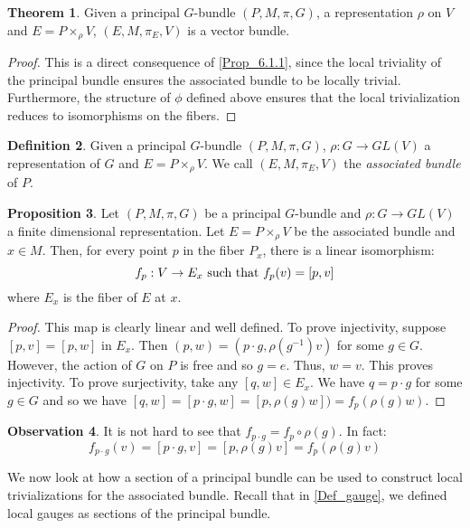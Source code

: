 \documentclass[12pt,a4paper]{report}
\theoremstyle{definition}
\newtheorem{Def}{Definition}[chapter]
\theoremstyle{Theorem}
\newtheorem{Theo}[Def]{Theorem}
\newtheorem{Prop}[Def]{Proposition}
\theoremstyle{definition}
\theoremstyle{definition}
\newtheorem{Obs}[Def]{Observation}
\begin{document}
	\begin{Theo}
		Given a principal $G$-bundle $(P,M,\pi,G)$, a representation $\rho$ on $V$ and $E=P\times_\rho V$,  $(E,M,\pi_E,V)$ is a vector bundle.
	\end{Theo}
	\begin{proof}
		\begin{comment}
			The proof follows from proposition \ref{Prop_6.1.1}. In fact the principal bundle is locally trivial and this implies that the associated bundle is locally trivial as well, with fiber $V$
		\end{comment}
		This is a direct consequence of \ref{Prop_6.1.1}, since the local triviality of the principal bundle ensures the associated bundle to be locally trivial. Furthermore, the structure of $\phi$ defined above ensures that the local trivialization reduces to isomorphisms on the fibers.
	\end{proof}
	\begin{Def}
		Given a principal $G$-bundle $(P,M,\pi,G)$, $\rho:G\rightarrow GL(V)$ a representation of $G$ and $E=P\times_\rho V$. We call $(E,M,\pi_E,V)$ the \textit{associated bundle} of $P$.
	\end{Def}
	\begin{Prop}\label{Prop_6.2.2}
		Let $(P,M,\pi,G)$ be a principal $G$-bundle and $\rho:G\rightarrow GL(V)$ a finite dimensional representation. Let $E=P\times_\rho V$ be the associated bundle and $x\in M$. Then, for every point $p$ in the fiber $P_x$, there is a linear isomorphism:
		$$f_p:V\rightarrow E_x \hbox{ such that }f_p(v)=[p,v]$$ 
		where $E_x$ is the fiber of $E$ at $x$.
	\end{Prop}
	\begin{proof}
		This map is clearly linear and well defined. To prove injectivity, suppose $[p,v]=[p,w]$ in $E_x$. Then $(p,w)=(p\cdot g,\rho(g^{-1})v)$ for some $g\in G$. However, the action of $G$ on $P$ is free and so $g=e$. Thus, $w=v$. This proves injectivity. To prove surjectivity, take any $[q,w]\in E_x$. We have $q=p\cdot g$ for some $g\in G$ and so we have $[q,w]=[p\cdot g,w]=[p,\rho(g)w])=f_p(\rho(g)w)$.
	\end{proof}
	\begin{Obs}\label{Obs_6.2.3}
		It is not hard to see that $f_{p\cdot g}=f_p\circ \rho(g)$. In fact:
		$$f_{p\cdot g}(v)=[p\cdot g,v]=[p,\rho(g)v]=f_p(\rho(g)v)$$
	\end{Obs}
	We now look at how a section of a principal bundle can be used to construct local trivializations for the associated bundle. Recall that in \ref{Def_gauge}, we defined local gauges as sections of the principal bundle.
\end{document}
